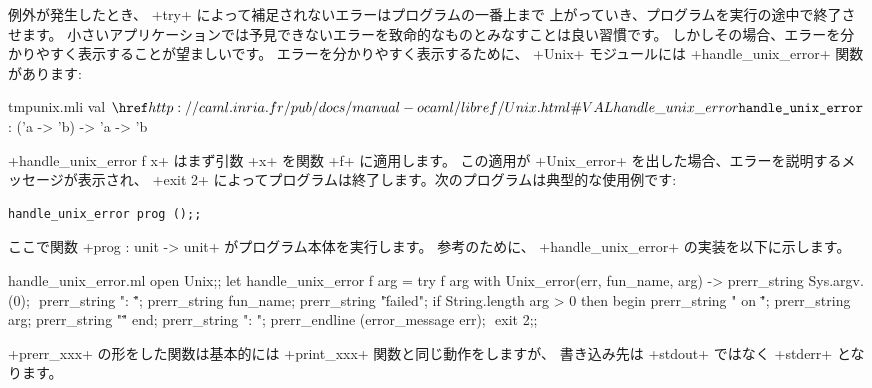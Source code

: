 例外が発生したとき、 \ml+try+ によって補足されないエラーはプログラムの一番上まで
上がっていき、プログラムを実行の途中で終了させます。
小さいアプリケーションでは予見できないエラーを致命的なものとみなすことは良い習慣です。
しかしその場合、エラーを分かりやすく表示することが望ましいです。
エラーを分かりやすく表示するために、 \ml+Unix+ モジュールには \ml+handle_unix_error+ 関数があります:
%
\begin{listingcodefile}{tmpunix.mli}
val $\indexlibvalue{Unix}{handle\_unix\_error}$ : ('a -> 'b) -> 'a -> 'b
\end{listingcodefile}
%
\ml+handle_unix_error f x+ はまず引数 \ml+x+ を関数 \ml+f+ に適用します。
この適用が \ml+Unix_error+ を出した場合、エラーを説明するメッセージが表示され、
\ml+exit 2+ によってプログラムは終了します。次のプログラムは典型的な使用例です:
%
\begin{lstlisting}
handle_unix_error prog ();;
\end{lstlisting}
%
ここで関数 \ml+prog : unit -> unit+ がプログラム本体を実行します。
参考のために、 \ml+handle_unix_error+ の実装を以下に示します。
%
\begin{listingcodefile}[style=numbers]{handle_unix_error.ml}
open Unix;;
let handle_unix_error f arg =
  try
    f arg
  with Unix_error(err, fun_name, arg) ->
    prerr_string Sys.argv.(0); $\label{prog:argv}$
    prerr_string ": \"";
    prerr_string fun_name;
    prerr_string "\" failed";
    if String.length arg > 0 then begin
      prerr_string " on \"";
      prerr_string arg;
      prerr_string "\""
    end;
    prerr_string ": ";
    prerr_endline (error_message err); $\label{prog:errmsg}$
    exit 2;;
\end{listingcodefile}
%
\ml+prerr_xxx+ の形をした関数は基本的には \ml+print_xxx+ 関数と同じ動作をしますが、
書き込み先は \ml+stdout+ ではなく \ml+stderr+ となります。

